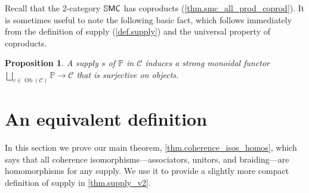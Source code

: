 \documentclass[11pt, oneside, article]{memoir}
\theoremstyle{plain}
\newtheorem{proposition}[theorem]{Proposition}
\theoremstyle{definition}
\theoremstyle{remark}
\newcommand{\Set}[1]{\mathrm{#1}}%
\newcommand{\cat}[1]{\mathcal{#1}}%
\newcommand{\Cat}[1]{{\mathsf{#1}}}%
\newcommand{\CCat}[1]{\mathbb{\StrLeft{#1}{1}}\Cat{\StrGobbleLeft{#1}{1}}}%
\DeclareMathOperator{\ob}{\Set{Ob}}
\newcommand{\ssmc}{\CCat{SMC}}
\newcommand{\pp}{\mathbb{P}}
\begin{document}
Recall that the 2-category $\ssmc$ has coproducts (\cref{thm.smc_all_prod_coprod}). It is sometimes useful to note the following basic fact, which follows immediately from the definition of supply (\cref{def.supply}) and the universal property of coproducts.

\begin{proposition}
A supply $s$ of $\pp$ in $\cat{C}$ induces a strong monoidal functor $\bigsqcup_{c\in\ob(\cat{C})}\pp\to\cat{C}$ that is surjective on objects.
\end{proposition}

\section{An equivalent definition}\label{sec.main_thm}

In this section we prove our main theorem, \cref{thm.coherence_isos_homos}, which says that all coherence isomorphisms---associators, unitors, and braiding---are homomorphisms for any supply. We use it to provide a slightly more compact definition of supply in \cref{thm.supply_v2}.
\end{document}
